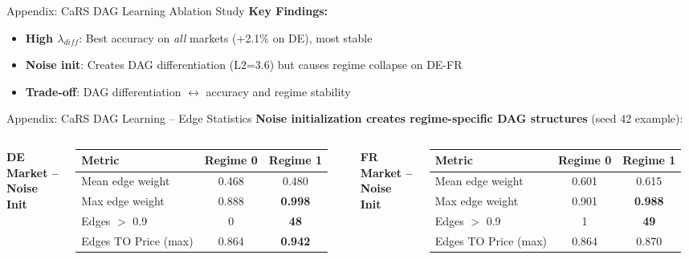 \documentclass[aspectratio=169]{beamer}
\begin{document}
\begin{frame}{Appendix: CaRS DAG Learning Ablation Study}
\textbf{Key Findings:}
\begin{itemize}
    \item \textbf{High $\lambda_{diff}$}: Best accuracy on \textit{all} markets (+2.1\% on DE), most stable
    \item \textbf{Noise init}: Creates DAG differentiation (L2=3.6) but causes regime collapse on DE-FR
    \item \textbf{Trade-off}: DAG differentiation $\leftrightarrow$ accuracy and regime stability
\end{itemize}
\end{frame}

\begin{frame}{Appendix: CaRS DAG Learning -- Edge Statistics}
\textbf{Noise initialization creates regime-specific DAG structures} (seed 42 example):

\vspace{0.3cm}
\begin{columns}[T]
\textbf{DE Market -- Noise Init}
\begin{table}
\scriptsize
\begin{tabular}{l|cc}
\toprule
\textbf{Metric} & \textbf{Regime 0} & \textbf{Regime 1} \\
\midrule
Mean edge weight & 0.468 & 0.480 \\
Max edge weight & 0.888 & \textbf{0.998} \\
Edges $>$ 0.9 & 0 & \textbf{48} \\
Edges TO Price (max) & 0.864 & \textbf{0.942} \\
\bottomrule
\end{tabular}
\end{table}

\textbf{FR Market -- Noise Init}
\begin{table}
\scriptsize
\begin{tabular}{l|cc}
\toprule
\textbf{Metric} & \textbf{Regime 0} & \textbf{Regime 1} \\
\midrule
Mean edge weight & 0.601 & 0.615 \\
Max edge weight & 0.901 & \textbf{0.988} \\
Edges $>$ 0.9 & 1 & \textbf{49} \\
Edges TO Price (max) & 0.864 & 0.870 \\
\bottomrule
\end{tabular}
\end{table}
\end{columns}


\end{frame}
\end{document}
